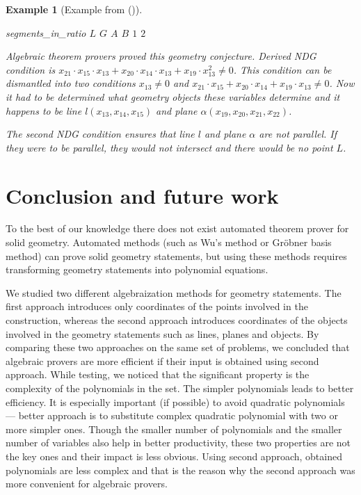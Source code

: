 \documentclass[final,1p,times,authoryear]{elsarticle}
\newtheorem{example}[theorem]{Example}
\begin{document}
\begin{example}[Example from (\cite{arhzbirka})]
\begin{footnotesize}
{\begin{tabbing}
\>segments\_in\_ratio $L$ $G$ $A$ $B$ $1$ $2$
\end{tabbing}
}
\end{footnotesize}

Algebraic theorem provers proved this geometry conjecture. Derived NDG
condition is $x_{21} \cdot x_{15} \cdot x_{13} + x_{20} \cdot x_{14}
\cdot x_{13} + x_{19} \cdot x_{13}^2 \neq 0$. This condition can be
dismantled into two conditions $x_{13} \neq 0$ and $x_{21} \cdot
x_{15} + x_{20} \cdot x_{14} + x_{19} \cdot x_{13} \neq 0$. Now it had
to be determined what geometry objects these variables determine and
it happens to be line $l(x_{13}, x_{14}, x_{15})$ and plane
$\alpha(x_{19}, x_{20}, x_{21}, x_{22})$.

The second NDG condition ensures that line $l$ and plane $\alpha$
are not parallel. If they were to be parallel, they would not
intersect and there would be no point $L$. 
\end{example}

\section{Conclusion and future work}

To the best of our knowledge there does not exist automated theorem
prover for solid geometry. Automated methods (such as Wu's method or
Gr\"obner basis method) can prove solid geometry statements, but using
these methods requires transforming geometry statements into
polynomial equations.

We studied two different algebraization methods for geometry
statements. The first approach introduces only coordinates of the
points involved in the construction, whereas the second approach
introduces coordinates of the objects involved in the geometry
statements such as lines, planes and objects. By comparing these two
approaches on the same set of problems, we concluded that algebraic
provers are more efficient if their input is obtained using second
approach. While testing, we noticed that the significant property is
the complexity of the polynomials in the set. The simpler polynomials
leads to better efficiency. It is especially important (if possible)
to avoid quadratic polynomials --- better approach is to substitute
complex quadratic polynomial with two or more simpler ones. Though the
smaller number of polynomials and the smaller number of variables also
help in better productivity, these two properties are not the key ones
and their impact is less obvious. Using second approach, obtained
polynomials are less complex and that is the reason why the second
approach was more convenient for algebraic provers.
\end{document}

